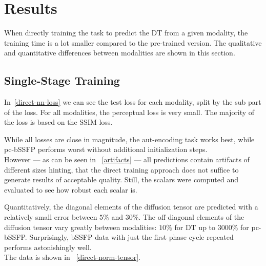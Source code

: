 \chapter{Results}\label{\positionnumber}
When directly training the task to predict the DT from a given modality, the training time is a lot smaller compared to the pre-trained version.
The qualitative and quantitative differences between modalities are shown in this section.
\section{Single-Stage Training}
In~\ref{direct-nn-loss} we can see the test loss for each modality, split by the sub part of the loss.
For all modalities, the perceptual loss is very small.
The majority of the loss is based on the SSIM loss.

While all losses are close in magnitude, the aut-encoding task works best, while pc-bSSFP performs worst without additional initialization steps. \\

However --- as can be seen in ~\ref{artifacts} --- all predictions contain artifacts of different sizes hinting, that the direct training approach does not suffice to generate results of acceptable quality.
Still, the scalars were computed and evaluated to see how robust each scalar is.

Quantitatively, the diagonal elements of the diffusion tensor are predicted with a relatively small error between $5\%$ and $30\%$.
The off-diagonal elements of the diffusion tensor vary greatly between modalities: $10\%$ for DT up to $3000\%$ for pc-bSSFP.
Surprisingly, bSSFP data with just the first phase cycle repeated performs astonishingly well. \\
The data is shown in ~\ref{direct-norm-tensor}.

